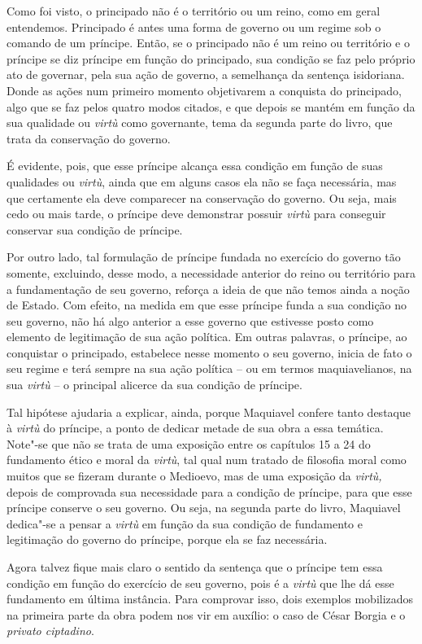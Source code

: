 Como foi visto, o principado não é o território ou um reino, como em
geral entendemos. Principado é antes uma forma de governo ou um regime
sob o comando de um príncipe. Então, se o principado não é um reino ou
território e o príncipe se diz príncipe em função do principado, sua
condição se faz pelo próprio ato de governar, pela sua ação de governo,
a semelhança da sentença isidoriana. Donde as ações num primeiro momento
objetivarem a conquista do principado, algo que se faz pelos quatro
modos citados, e que depois se mantém em função da sua qualidade ou
\emph{virtù} como governante, tema da segunda parte do livro, que trata
da conservação do governo.

É evidente, pois, que esse príncipe alcança essa condição em função de
suas qualidades ou \emph{virtù}, ainda que em alguns casos ela não se
faça necessária, mas que certamente ela deve comparecer na conservação
do governo. Ou seja, mais cedo ou mais tarde, o príncipe deve demonstrar
possuir \emph{virtù} para conseguir conservar sua condição de príncipe.

Por outro lado, tal formulação de príncipe fundada no exercício do
governo tão somente, excluindo, desse modo, a necessidade anterior do
reino ou território para a fundamentação de seu governo, reforça a ideia
de que não temos ainda a noção de Estado. Com efeito, na medida em que
esse príncipe funda a sua condição no seu governo, não há algo anterior
a esse governo que estivesse posto como elemento de legitimação de sua
ação política. Em outras palavras, o príncipe, ao conquistar o
principado, estabelece nesse momento o seu governo, inicia de fato o seu
regime e terá sempre na sua ação política -- ou em termos
maquiavelianos, na sua \emph{virtù} -- o principal alicerce da sua
condição de príncipe.

Tal hipótese ajudaria a explicar, ainda, porque Maquiavel confere tanto
destaque à \emph{virtù} do príncipe, a ponto de dedicar metade de sua
obra a essa temática. Note"-se que não se trata de uma exposição entre os
capítulos 15 a 24 do fundamento ético e moral da \emph{virtù}, tal qual
num tratado de filosofia moral como muitos que se fizeram durante o
Medioevo, mas de uma exposição da \emph{virtù,} depois de comprovada sua
necessidade para a condição de príncipe, para que esse príncipe conserve
o seu governo. Ou seja, na segunda parte do livro, Maquiavel dedica"-se a
pensar a \emph{virtù} em função da sua condição de fundamento e
legitimação do governo do príncipe, porque ela se faz necessária.

Agora talvez fique mais claro o sentido da sentença que o príncipe tem
essa condição em função do exercício de seu governo, pois é a
\emph{virtù} que lhe dá esse fundamento em última instância. Para
comprovar isso, dois exemplos mobilizados na primeira parte da obra
podem nos vir em auxílio: o caso de César Borgia e o \emph{privato
ciptadino}.

